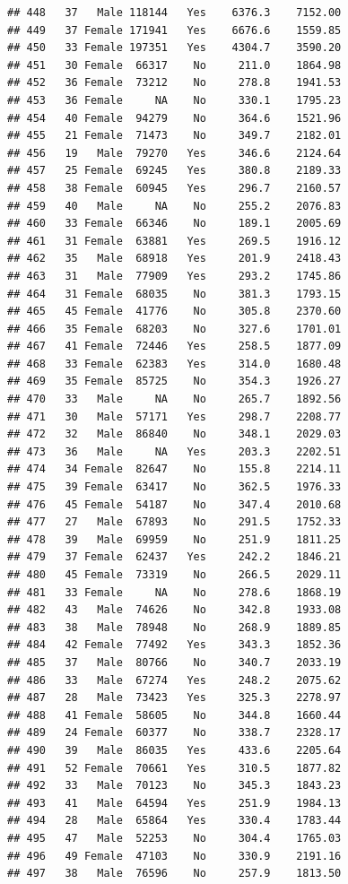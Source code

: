 \documentclass[12pt,]{krantz}
\theoremstyle{definition}
\theoremstyle{definition}
\theoremstyle{remark}
\begin{document}
\begin{verbatim}
## 448   37   Male 118144   Yes    6376.3    7152.00
## 449   37 Female 171941   Yes    6676.6    1559.85
## 450   33 Female 197351   Yes    4304.7    3590.20
## 451   30 Female  66317    No     211.0    1864.98
## 452   36 Female  73212    No     278.8    1941.53
## 453   36 Female     NA    No     330.1    1795.23
## 454   40 Female  94279    No     364.6    1521.96
## 455   21 Female  71473    No     349.7    2182.01
## 456   19   Male  79270   Yes     346.6    2124.64
## 457   25 Female  69245   Yes     380.8    2189.33
## 458   38 Female  60945   Yes     296.7    2160.57
## 459   40   Male     NA    No     255.2    2076.83
## 460   33 Female  66346    No     189.1    2005.69
## 461   31 Female  63881   Yes     269.5    1916.12
## 462   35   Male  68918   Yes     201.9    2418.43
## 463   31   Male  77909   Yes     293.2    1745.86
## 464   31 Female  68035    No     381.3    1793.15
## 465   45 Female  41776    No     305.8    2370.60
## 466   35 Female  68203    No     327.6    1701.01
## 467   41 Female  72446   Yes     258.5    1877.09
## 468   33 Female  62383   Yes     314.0    1680.48
## 469   35 Female  85725    No     354.3    1926.27
## 470   33   Male     NA    No     265.7    1892.56
## 471   30   Male  57171   Yes     298.7    2208.77
## 472   32   Male  86840    No     348.1    2029.03
## 473   36   Male     NA   Yes     203.3    2202.51
## 474   34 Female  82647    No     155.8    2214.11
## 475   39 Female  63417    No     362.5    1976.33
## 476   45 Female  54187    No     347.4    2010.68
## 477   27   Male  67893    No     291.5    1752.33
## 478   39   Male  69959    No     251.9    1811.25
## 479   37 Female  62437   Yes     242.2    1846.21
## 480   45 Female  73319    No     266.5    2029.11
## 481   33 Female     NA    No     278.6    1868.19
## 482   43   Male  74626    No     342.8    1933.08
## 483   38   Male  78948    No     268.9    1889.85
## 484   42 Female  77492   Yes     343.3    1852.36
## 485   37   Male  80766    No     340.7    2033.19
## 486   33   Male  67274   Yes     248.2    2075.62
## 487   28   Male  73423   Yes     325.3    2278.97
## 488   41 Female  58605    No     344.8    1660.44
## 489   24 Female  60377    No     338.7    2328.17
## 490   39   Male  86035   Yes     433.6    2205.64
## 491   52 Female  70661   Yes     310.5    1877.82
## 492   33   Male  70123    No     345.3    1843.23
## 493   41   Male  64594   Yes     251.9    1984.13
## 494   28   Male  65864   Yes     330.4    1783.44
## 495   47   Male  52253    No     304.4    1765.03
## 496   49 Female  47103    No     330.9    2191.16
## 497   38   Male  76596    No     257.9    1813.50

\end{verbatim}
\end{document}
